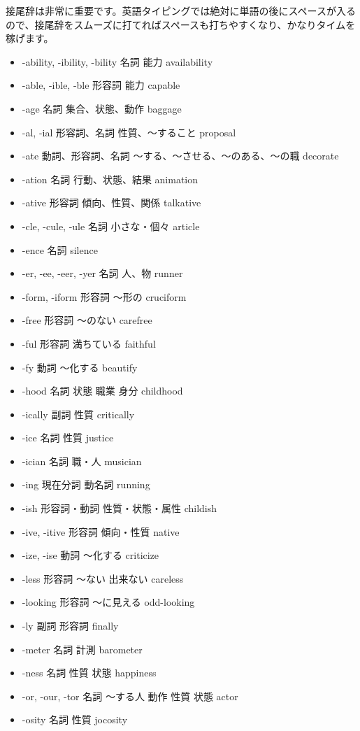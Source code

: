 接尾辞は非常に重要です。英語タイピングでは絶対に単語の後にスペースが入るので、接尾辞をスムーズに打てればスペースも打ちやすくなり、かなりタイムを稼げます。
\begin{itemize}
 \item -ability, -ibility, -bility 名詞 能力 availability
 \item -able, -ible, -ble 形容詞 能力 capable
 \item -age 名詞 集合、状態、動作 baggage
 \item -al, -ial 形容詞、名詞 性質、～すること proposal
 \item -ate 動詞、形容詞、名詞 ～する、～させる、～のある、～の職 decorate
 \item -ation 名詞 行動、状態、結果 animation
 \item -ative 形容詞 傾向、性質、関係 talkative
 \item -cle, -cule, -ule 名詞 小さな・個々 article
 \item -ence 名詞 silence
 \item -er, -ee, -eer, -yer 名詞 人、物 runner
 \item -form, -iform 形容詞 ～形の cruciform
 \item -free 形容詞 ～のない carefree
 \item -ful 形容詞 満ちている faithful
 \item -fy 動詞 ～化する beautify
 \item -hood 名詞 状態 職業 身分 childhood
 \item -ically 副詞 性質 critically
 \item -ice 名詞 性質 justice
 \item -ician 名詞 職・人 musician
 \item -ing 現在分詞 動名詞 running
 \item -ish 形容詞・動詞 性質・状態・属性 childish
 \item -ive, -itive 形容詞 傾向・性質 native
 \item -ize, -ise 動詞 ～化する criticize
 \item -less 形容詞 ～ない 出来ない careless
 \item -looking 形容詞 ～に見える odd-looking
 \item -ly 副詞 形容詞 finally
 \item -meter 名詞 計測 barometer
 \item -ness 名詞 性質 状態 happiness
 \item -or, -our, -tor 名詞 ～する人 動作 性質 状態 actor
 \item -osity 名詞 性質 jocosity

\end{itemize}
